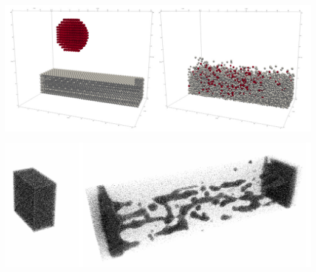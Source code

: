 \noindent
\begin{minipage}[t]{0.5\textwidth} %
    \centering
    \includegraphics[width=0.9\linewidth]{imgs/fallingDrop.png} %
    \label{fig:fd}
\end{minipage}%
\begin{minipage}[t]{0.5\textwidth} %
    \centering
    \includegraphics[width=0.9\linewidth]{imgs/explodingLiquid.png} %
    \label{fig:exl}
\end{minipage}

\vspace{1em} %

